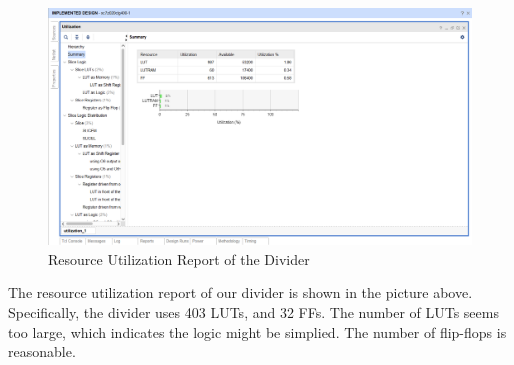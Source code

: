 \documentclass[a4paper]{article}
\begin{document}
\begin{figure}[H]
    \centering
    \includegraphics[width=14cm]{9}
    \caption{Resource Utilization Report of the Divider}
    \label{fig:9}
\end{figure}
The resource utilization report of our divider is shown in the picture above. Specifically, the divider uses 403 LUTs, and 32 FFs. The number of LUTs seems too large, which indicates the logic might be simplied. The number of flip-flops is reasonable. 
\end{document}
